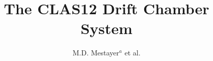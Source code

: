 \documentclass{elsart}
\begin{document}
\begin{frontmatter}
  
\title{The CLAS12 Drift Chamber System}

\author{M.D. Mestayer$^a$ et al.}





\end{frontmatter}































\end{document}
